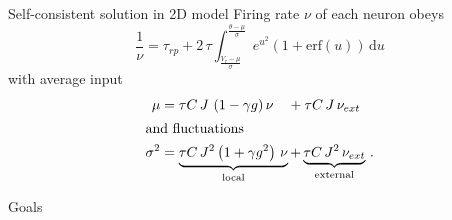 \documentclass[xcolor=x11names,compress]{beamer}
\renewcommand{\(}{\begin{columns}}
\renewcommand{\)}{\end{columns}}
\newcommand{\<}[1]{\begin{column}{#1}}
\renewcommand{\>}{\end{column}}
\begin{document}
\begin{frame}[t]{Self-consistent solution in 2D model}
Firing rate $\nu$ of each neuron obeys
\begin{equation}
    \frac{1}{\nu} = \tau_{rp} + 
        2 \, \tau \int_{\frac{V_r - \mu}{\sigma}}^{\frac{\theta - \mu}{\sigma}} 
        e^{u^2} \left(1 + \text{erf}(u)\right) \,\text{d}u 
\end{equation}
with average input
\begin{align}
    \mu        &= 
        \tau C \, J \,\left(1 - \gamma g \right) \nu \quad
        + 
        \tau C \, J \, \nu_{ext} \\
\intertext{and fluctuations}
    {\sigma}^2 &=
        \underbrace{
            \tau C \, J^2 \left(1 + \gamma g^2\right) \, \nu
        }_\text{local} +
        \underbrace{
            \tau C \, J^2 \,\nu_{ext} 
        }_\text{external} \,.
\end{align}
\end{frame}

\begin{frame}[t]{Goals}
\begin{enumerate}
\end{enumerate}
\end{frame}
\end{document}
